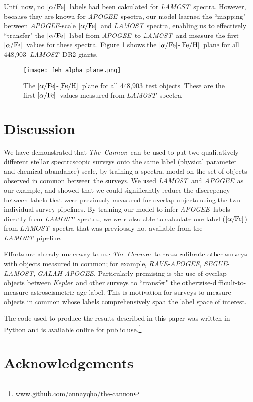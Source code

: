 \documentclass[12pt, preprint]{aastex}
\newcommand{\tc}{\textsl{The~Cannon}}
\newcommand{\apogee}{\textsl{APOGEE}}
\newcommand{\lamost}{\textsl{LAMOST}}
\newcommand{\segue}{\textsl{SEGUE}}
\newcommand{\rave}{\textsl{RAVE}}
\newcommand{\galah}{\textsl{GALAH}}
\newcommand{\kepler}{\textsl{Kepler}}
\newcommand{\feh}{\mbox{$\rm [Fe/H]$}}
\newcommand{\alphafe}{\mbox{$\rm [\alpha/Fe]$}}
\newcommand{\ntestobj}{448,903}
\begin{document}
Until now, no \alphafe\ labels had been calculated for \lamost\ spectra.
However, because they are known for \apogee\ spectra, 
our model learned the ``mapping" between
\apogee-scale \alphafe\ and \lamost\ spectra, enabling us to effectively 
``transfer" the \alphafe\ label from \apogee\ to \lamost\ and measure
the first \alphafe\ values for these spectra. 
Figure \ref{fig:alpha-feh} shows the \alphafe-\feh\ 
plane for all \ntestobj\ \lamost\ DR2 giants. 

\begin{figure}[h!]
\centering
\texttt{[image: feh\_alpha\_plane.png]}
\caption{The \alphafe-\feh\ plane for all \ntestobj\ test objects. These are the first
\alphafe\ values measured from \lamost\ spectra.}
\label{fig:alpha-feh}
\end{figure}

\section{Discussion}

We have demonstrated that \tc\ can be used to put two qualitatively different stellar 
spectroscopic surveys onto the same label (physical parameter and chemical abundance)
scale, by training a spectral model on the set of objects observed in common between
the surveys. We used \lamost\ and \apogee\ as our example, and showed that we could
significantly reduce the discrepency between labels that were previously measured for overlap
objects using the two individual survey pipelines. By training our model to
infer \apogee\ labels directly from \lamost\ spectra, we were also able to calculate one label
(\alphafe) from \lamost\ spectra that was previously not available from the \lamost\ pipeline. 

Efforts are already underway to use \tc\ to cross-calibrate other surveys with
objects measured in common; for example, \rave-\apogee, \segue-\lamost, \galah-\apogee. 
Particularly promising is the use of overlap objects between \kepler\ and other surveys to
``transfer" the otherwise-difficult-to-measure astroseismetric age label. 
This is motivation for surveys to measure objects in common whose labels 
comprehensively span the label space of interest. 

The code used to produce the results described in this paper was written in
Python and is available online for public 
use.\footnote{\url{www.github.com/annayqho/the-cannon}}

\section{Acknowledgements}
\end{document}
